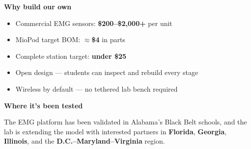 \documentclass[10pt,letterpaper]{article}
\newcommand{\boxhead}[1]{{\fontsize{10.5}{12}\selectfont\bfseries #1}\par\vspace{2pt}}
\begin{document}
\begin{minipage}[t]{0.36\linewidth}
  \begin{tcolorbox}[hbox]
    \boxhead{Why build our own}
    \vspace{1pt}
    \begin{itemize}
      \item Commercial EMG sensors: \textbf{\$200--\$2,000+} per unit
      \item MioPod target BOM: \textbf{$\approx$\$4} in parts
      \item Complete station target: \textbf{under \$25}
      \item Open design --- students can inspect and rebuild every stage
      \item Wireless by default --- no tethered lab bench required
    \end{itemize}
  \end{tcolorbox}
  \vspace{6pt}
  \begin{tcolorbox}[hbox]
    \boxhead{Where it's been tested}
    \vspace{1pt}
    {\small The EMG platform has been validated in Alabama's Black Belt schools, and the lab is extending the model with interested partners in \textbf{Florida}, \textbf{Georgia}, \textbf{Illinois}, and the \textbf{D.C.--Maryland--Virginia} region.\par}
  \end{tcolorbox}
\end{minipage}
\end{document}
